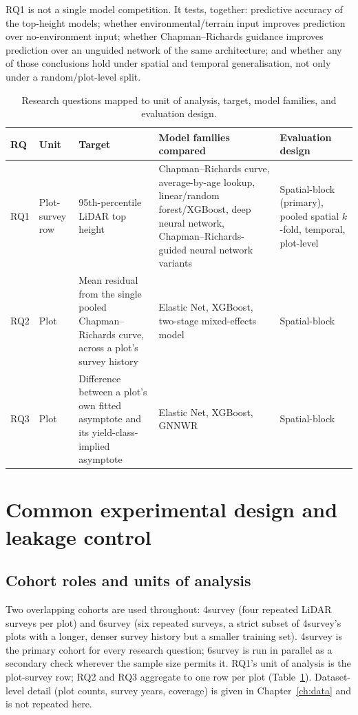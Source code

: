 RQ1 is not a single model competition. It tests, together: predictive accuracy of the
top-height models; whether environmental/terrain input improves prediction over no-environment
input; whether Chapman--Richards guidance improves prediction over an unguided network of the
same architecture; and whether any of those conclusions hold under spatial and temporal
generalisation, not only under a random/plot-level split.

\begin{table}[!htbp]
\centering
\scriptsize
\renewcommand{\arraystretch}{1.2}
\begin{tabular}{p{0.8cm}p{1.4cm}p{3.3cm}p{4.2cm}p{2.9cm}}
\toprule
RQ & Unit & Target & Model families compared & Evaluation design \\
\midrule
RQ1 & Plot-survey row & 95th-percentile LiDAR top height & Chapman--Richards curve, average-by-age
lookup, linear/random forest/XGBoost, deep neural network, Chapman--Richards-guided neural network
variants & Spatial-block (primary), pooled spatial $k$-fold, temporal, plot-level \\
RQ2 & Plot & Mean residual from the single pooled Chapman--Richards curve, across a plot's survey
history & Elastic Net, XGBoost, two-stage mixed-effects model & Spatial-block \\
RQ3 & Plot & Difference between a plot's own fitted asymptote and its yield-class-implied
asymptote & Elastic Net, XGBoost, GNNWR & Spatial-block \\
\bottomrule
\end{tabular}
\caption{Research questions mapped to unit of analysis, target, model families, and evaluation
design.}
\label{tab:rq-framework}
\end{table}

\section{Common experimental design and leakage control}
\label{sec:common-design}

\subsection{Cohort roles and units of analysis}
\label{sec:cohorts}

Two overlapping cohorts are used throughout: 4survey (four repeated LiDAR surveys per plot) and
6survey (six repeated surveys, a strict subset of 4survey's plots with a longer, denser survey
history but a smaller training set). 4survey is the primary cohort for every research question;
6survey is run in parallel as a secondary check wherever the sample size permits it. RQ1's unit of
analysis is the plot-survey row; RQ2 and RQ3 aggregate to one row per plot (Table~\ref{tab:rq-framework}).
Dataset-level detail (plot counts, survey years, coverage) is given in Chapter~\ref{ch:data} and
is not repeated here.

